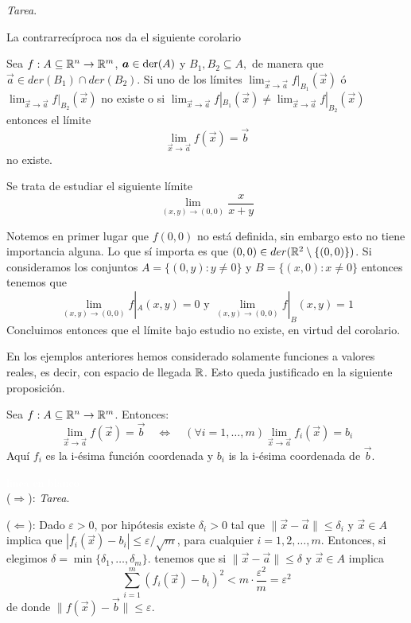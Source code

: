 \begin{demostracion}
\emph{Tarea}.
\end{demostracion}

La contrarrec\'iproca nos da el siguiente corolario
\begin{corolario} Sea $f:A\subseteq\mathbb{R}^n\to\mathbb{R}^m$, $\boldsymbol{a}\in \text{der}({A})$ y 
$B_1,B_2\subseteq A,$ de manera que $\vec{a}\in der(B_1)\cap der(B_2)$. 
Si uno de los l\'imites $\displaystyle \lim_{\vec{x}\to \vec{a}}f|_{B_1}(\vec{x})$ \'o $\displaystyle \lim_{\vec{x}\to \vec{a}}f|_{B_2}(\vec{x})$
no existe o si $\displaystyle \lim_{\vec{x}\to \vec{a}}f|_{B_1}(\vec{x})\neq \displaystyle \lim_{\vec{x}\to \vec{a}}f|_{B_2}(\vec{x})$ entonces el l\'imite
$$\lim_{\vec{x}\to \vec{a}}f(\vec{x})=\vec{b}$$
no existe.
\end{corolario}

\begin{ejemplo} 
Se trata de estudiar el siguiente l\'imite 
$$
\lim_{(x,y)\to (0,0)}\frac{x}{x+y}
$$
\begin{solucion} 
Notemos en primer lugar que $f(0,0)$ no est\'a definida, sin embargo esto no tiene
importancia alguna. Lo que s\'i importa es que $(0,0)\in der(\mathbb{R}^2\setminus \{(0,0)\})$.
Si consideramos los conjuntos $A=\{(0,y): y\neq 0\}$ y  $B=\{(x,0):x\neq 0\}$ entonces  tenemos  que
$$\lim_{(x,y)\to (0,0)}f|_A(x,y)=0 \text{ y } \lim_{(x,y)\to (0,0)}f|_B(x,y)=1$$
Concluimos entonces que el
l\'imite bajo estudio  no existe, en virtud del corolario.
\end{solucion}
\end{ejemplo}   

\begin{nota} En los ejemplos anteriores hemos considerado solamente
funciones a valores reales, es decir,  con espacio de llegada $\mathbb{R}$. Esto queda 
justificado en la siguiente proposici\'on.
\end{nota}

\begin{proposicion}\label{proposicion18}
Sea $f:A\subseteq\mathbb{R}^n\to\mathbb{R}^m$. Entonces:
$$\lim_{\vec{x}\to \vec{a}}f(\vec{x})=\vec{b}\quad \Leftrightarrow \quad (\forall i=1,\ldots,m)\lim_{\vec{x}\to \vec{a}}f_i(\vec{x})=b_i$$
Aqu\'i $f_i$ es la i-\'esima funci\'on coordenada y $b_i$ is la i-\'esima coordenada de $\vec{b}$.
\end{proposicion}

\begin{demostracion}
\textcolor{white}{linea en blanco}
\\($\Rightarrow$): \emph{Tarea}.

($\Leftarrow$): Dado $\varepsilon>0$, por hip\'otesis existe $\delta_i>0$ tal que 
$\|\vec{x}-\vec{a}\|\leq \delta_i$ y $\vec{x}\in A$ implica que $|f_i(\vec{x})-b_i|\leq \varepsilon/\sqrt{m}$, para cualquier
$i=1,2,\ldots,m$. Entonces, si elegimos $\delta=\min\{\delta_1, \ldots,\delta_m\}$. tenemos que si $\|\vec{x}-\vec{a}\|\leq \delta$ y $\vec{x}\in A$ implica
$$
\sum_{i=1}^m(f_i(\vec{x})-b_i)^2<m\cdot\frac{\varepsilon^2}{m}=\varepsilon^2
$$
de donde $\|f(\vec{x})-\vec{b}\|\leq\varepsilon$.
\end{demostracion}

